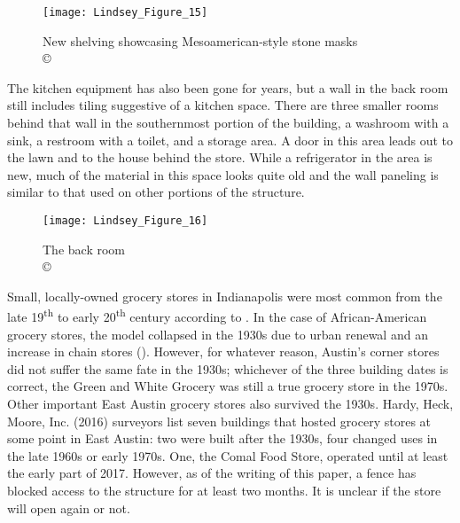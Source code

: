 \begin{figure}[!htb]
	\texttt{[image: Lindsey\_Figure\_15]}
	\caption{New shelving showcasing Mesoamerican-style stone masks\\
		{\normalfont\scriptsize \copyright\
			\shortauthor
	}}
	\label{fig:Lindsey_Figure_15}
\end{figure}

The kitchen equipment has also been gone for years, but a wall in the back room still includes tiling suggestive of a kitchen space. There are three smaller rooms behind that wall in the southernmost portion of the building, a washroom with a sink, a restroom with a toilet, and a storage area. A door in this area leads out to the lawn and to the house behind the store. While a refrigerator in the area is new, much of the material in this space looks quite old and the wall paneling is similar to that used on other portions of the structure.

\begin{figure}[!htb]
	\texttt{[image: Lindsey\_Figure\_16]}
	\caption{The back room\\
		{\normalfont\scriptsize \copyright\
			\shortauthor
	}}
	\label{fig:Lindsey_Figure_16}
\end{figure}


Small, locally-owned grocery stores in Indianapolis were most common from the late 19\textsuperscript{th} to early 20\textsuperscript{th} century according to \textcite{mullins}. In the case of African-American grocery stores, the model collapsed in the 1930s due to urban renewal and an increase in chain stores (\cite[88]{mullins}). However, for whatever reason, Austin’s corner stores did not suffer the same fate in the 1930s; whichever of the three building dates is correct, the Green and White Grocery was still a true grocery store in the 1970s. Other important East Austin grocery stores also survived the 1930s. Hardy, Heck, Moore, Inc. (2016) surveyors list seven buildings that hosted grocery stores at some point in East Austin: two were built after the 1930s, four changed uses in the late 1960s or early 1970s. One, the Comal Food Store, operated until at least the early part of 2017. However, as of the writing of this paper, a fence has blocked access to the structure for at least two months. It is unclear if the store will open again or not.



